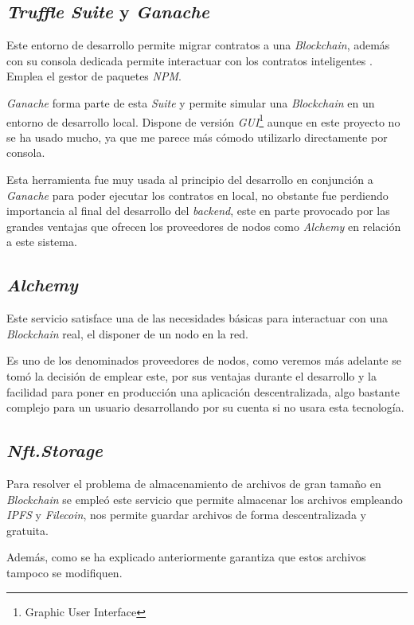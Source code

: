 \subsection{\textit{Truffle Suite} y \textit{Ganache}}
Este entorno de desarrollo permite migrar contratos a una \textit{Blockchain}, además con su consola dedicada permite interactuar con los contratos inteligentes \cite{trufflesuiteTruffleOverview}. Emplea el gestor de paquetes \textit{NPM}.

\textit{Ganache} forma parte de esta \textit{Suite} y permite simular una \textit{Blockchain} en un entorno de desarrollo local. Dispone de versión \textit{GUI}\footnote{Graphic User Interface} aunque en este proyecto no se ha usado mucho, ya que me parece más cómodo utilizarlo directamente por consola.

Esta herramienta fue muy usada al principio del desarrollo en conjunción a \textit{Ganache} para poder ejecutar los contratos en local, no obstante fue perdiendo importancia al final del desarrollo del \textit{backend}, este en parte provocado por las grandes ventajas que ofrecen los proveedores de nodos como \textit{Alchemy} en relación a este sistema.

\subsection{\textit{Alchemy}}
Este servicio satisface una de las necesidades básicas para interactuar con una \textit{Blockchain} real, el disponer de un nodo en la red\cite{alchemyWhatNode}.

Es uno de los denominados proveedores de nodos, como veremos más adelante se tomó la decisión de emplear este, por sus ventajas durante el desarrollo y la facilidad para poner en producción una aplicación descentralizada, algo bastante complejo para un usuario desarrollando por su cuenta si no usara esta tecnología.

\subsection{\textit{Nft.Storage}}
Para resolver el problema de almacenamiento de archivos de gran tamaño en \textit{Blockchain} se empleó este servicio que permite almacenar los archivos empleando \textit{IPFS} y \textit{Filecoin}, nos permite guardar archivos de forma descentralizada y gratuita.

Además, como se ha explicado anteriormente garantiza que estos archivos tampoco se modifiquen.

